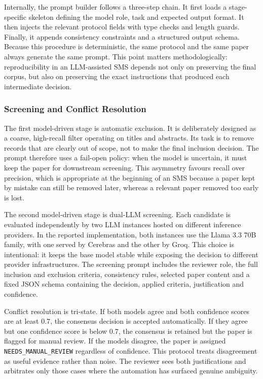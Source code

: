 Internally, the prompt builder follows a three-step chain. It first
loads a stage-specific skeleton defining the model role, task and
expected output format. It then injects the relevant protocol fields
with type checks and length guards. Finally, it appends consistency
constraints and a structured output schema. Because this procedure is
deterministic, the same protocol and the same paper always generate
the same prompt. This point matters methodologically: reproducibility
in an LLM-assisted SMS depends not only on preserving the final corpus,
but also on preserving the exact instructions that produced each
intermediate decision.

\subsubsection{Screening and Conflict Resolution}

The first model-driven stage is automatic exclusion. It is deliberately
designed as a coarse, high-recall filter operating on titles and
abstracts. Its task is to remove records that are clearly out of scope,
not to make the final inclusion decision. The prompt therefore uses a
fail-open policy: when the model is uncertain, it must keep the paper
for downstream screening. This asymmetry favours recall over precision,
which is appropriate at the beginning of an SMS because a paper kept by
mistake can still be removed later, whereas a relevant paper removed
too early is lost.

The second model-driven stage is dual-LLM screening. Each candidate is
evaluated independently by two LLM instances hosted on different
inference providers. In the reported implementation, both instances use
the Llama 3.3 70B family, with one served by Cerebras and the other by
Groq. This choice is intentional: it keeps the base model stable while
exposing the decision to different provider infrastructures. The
screening prompt includes the reviewer role, the full inclusion and
exclusion criteria, consistency rules, selected paper content and a
fixed JSON schema containing the decision, applied criteria,
justification and confidence.

Conflict resolution is tri-state. If both models agree and both
confidence scores are at least $0.7$, the consensus decision is
accepted automatically. If they agree but one confidence score is below
$0.7$, the consensus is retained but the paper is flagged for manual
review. If the models disagree, the paper is assigned
\texttt{NEEDS\_MANUAL\_REVIEW} regardless of confidence. This protocol
treats disagreement as useful evidence rather than noise. The reviewer
sees both justifications and arbitrates only those cases where the
automation has surfaced genuine ambiguity.

